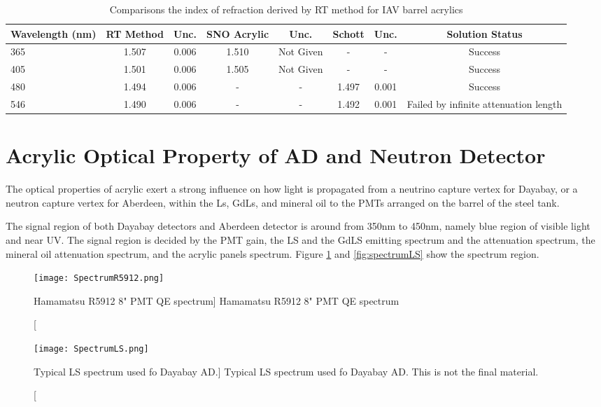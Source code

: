 \begin{table}
\centering
\caption{Comparisons the index of refraction derived by RT method for IAV barrel acrylics}
\label{tab:RTMethodResult}
\begin{tabular}{lccccccc}
\hline
Wavelength (nm) & RT Method & Unc. & SNO Acrylic & Unc. & Schott & Unc. & Solution Status\\
\hline
\hline
365 & 1.507 & 0.006 & 1.510 & Not Given & - & - & Success\\
\hline
405 & 1.501 & 0.006 & 1.505 & Not Given & - & - & Success\\
\hline
480 & 1.494 & 0.006 & - & - & 1.497 & 0.001 & Success\\
\hline
546 & 1.490 & 0.006 & - & - & 1.492 & 0.001 & Failed by infinite attenuation length\\
\hline
\end{tabular}
\end{table}


\section {Acrylic Optical Property of AD and Neutron Detector}

The optical properties of acrylic exert a strong influence on how light is propagated
from a neutrino capture vertex for Dayabay, or a neutron capture vertex for Aberdeen,
within the Ls, GdLs, and mineral oil to the PMTs arranged on the barrel of the steel tank.

The signal region of both Dayabay detectors and Aberdeen detector
is around from 350nm to 450nm, namely blue region of visible light and near UV.
The signal region is decided by the PMT gain, the LS and the GdLS emitting spectrum and
the attenuation spectrum, the mineral oil attenuation spectrum, and
the acrylic panels spectrum. Figure \ref{fig:SpectrumR5912} and \ref{fig:spectrumLS} show the spectrum region.


\begin{figure}
    \label{fig:SpectrumR5912}
    \centering
    \texttt{[image: SpectrumR5912.png]}
    \caption
    [Hamamatsu R5912 8" PMT QE spectrum]
    {Hamamatsu R5912 8" PMT QE spectrum}
    \end{figure}


\begin{figure}
    \label{fig:SpectrumLS}
    \centering
    \texttt{[image: SpectrumLS.png]}
    \caption
    [Typical LS spectrum used fo Dayabay AD.]
    {Typical LS spectrum used fo Dayabay AD. This is not the final material.}
    \end{figure}


